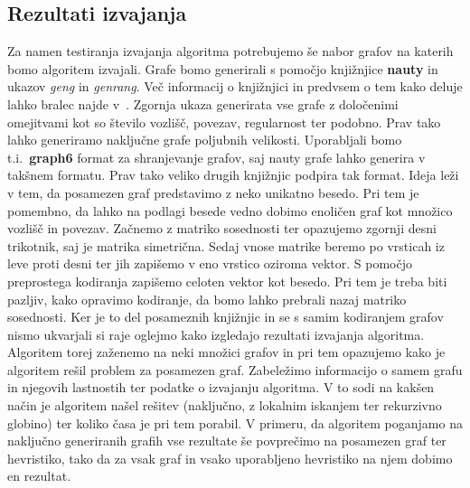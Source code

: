 \documentclass[12pt,a4paper,twoside]{article}
\theoremstyle{definition} %
\theoremstyle{plain} %
\numberwithin{equation}{section}  %
\begin{document}
\subsection{Rezultati izvajanja}
 Za namen testiranja izvajanja algoritma potrebujemo še nabor grafov na katerih bomo algoritem izvajali. Grafe bomo generirali s pomočjo knjižnjice \textbf{nauty} in ukazov \textit{geng} in \textit{genrang}. Več informacij o knjižnjici in predvsem o tem kako deluje lahko bralec najde v~\citet{nauty}. Zgornja ukaza generirata vse grafe z določenimi omejitvami kot so število vozlišč, povezav, regularnost ter podobno. Prav tako lahko generiramo naključne grafe poljubnih velikosti. Uporabljali bomo t.i.\ \textbf{graph6} format za shranjevanje grafov, saj nauty grafe lahko generira v takšnem formatu. Prav tako veliko drugih knjižnjic podpira tak format. Ideja leži v tem, da posamezen graf predstavimo z neko unikatno besedo. Pri tem je pomembno, da lahko na podlagi besede vedno dobimo enoličen graf kot množico vozlišč in povezav. Začnemo z matriko sosednosti ter opazujemo zgornji desni trikotnik, saj je matrika simetrična. Sedaj vnose matrike beremo po vrsticah iz leve proti desni ter jih zapišemo v eno vrstico oziroma vektor. S pomočjo preprostega kodiranja zapišemo celoten vektor kot besedo. Pri tem je treba biti pazljiv, kako opravimo kodiranje, da bomo lahko prebrali nazaj matriko sosednosti. Ker je to del posameznih knjižnjic in se s samim kodiranjem grafov nismo ukvarjali si raje oglejmo kako izgledajo rezultati izvajanja algoritma. Algoritem torej zaženemo na neki množici grafov in pri tem opazujemo kako je algoritem rešil problem za posamezen graf. Zabeležimo informacijo o samem grafu in njegovih lastnostih ter podatke o izvajanju algoritma. V to sodi na kakšen način je algoritem našel rešitev (naključno, z lokalnim iskanjem ter rekurzivno globino) ter koliko časa je pri tem porabil. V primeru, da algoritem poganjamo na naključno generiranih grafih vse rezultate še povprečimo na posamezen graf ter hevristiko, tako da za vsak graf in vsako uporabljeno hevristiko na njem dobimo en rezultat.
\end{document}
